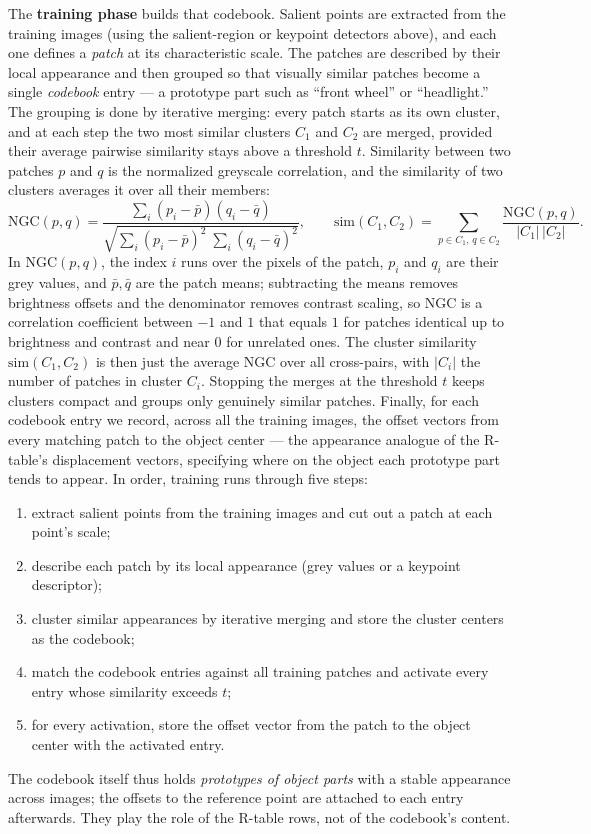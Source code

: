 The \textbf{training phase} builds that codebook. Salient points are extracted
from the training images (using the salient-region or keypoint detectors above),
and each one defines a \emph{patch} at its characteristic scale. The patches are
described by their local appearance and then grouped so that visually similar
patches become a single \emph{codebook} entry --- a prototype part such as ``front
wheel'' or ``headlight.'' The grouping is done by iterative merging: every patch
starts as its own cluster, and at each step the two most similar clusters $C_1$
and $C_2$ are merged, provided their average pairwise similarity stays above a
threshold $t$. Similarity between two patches $p$ and $q$ is the normalized
greyscale correlation, and the similarity of two clusters averages it over all
their members:
\begin{equation}
  \mathrm{NGC}(p,q) = \frac{\sum_i (p_i-\bar p)(q_i-\bar q)}
  {\sqrt{\sum_i (p_i-\bar p)^2 \;\sum_i (q_i-\bar q)^2}},
  \qquad
  \mathrm{sim}(C_1,C_2) = \!\!\sum_{p\in C_1,\,q\in C_2}\!\!
  \frac{\mathrm{NGC}(p,q)}{|C_1|\,|C_2|}.
  \label{eq:ngc}
\end{equation}
\noindent
In $\mathrm{NGC}(p,q)$, the index $i$ runs over the pixels of the patch, $p_i$ and
$q_i$ are their grey values, and $\bar p,\bar q$ are the patch means; subtracting
the means removes brightness offsets and the denominator removes contrast
scaling, so $\mathrm{NGC}$ is a correlation coefficient between $-1$ and $1$ that
equals $1$ for patches identical up to brightness and contrast and near $0$ for
unrelated ones. The cluster similarity $\mathrm{sim}(C_1,C_2)$ is then just the
average $\mathrm{NGC}$ over all cross-pairs, with $|C_i|$ the number of patches in
cluster $C_i$. Stopping the merges at the threshold $t$ keeps clusters compact and
groups only genuinely similar patches. Finally, for each codebook entry we record,
across all the training images, the offset vectors from every matching patch to
the object center --- the appearance analogue of the R-table's displacement
vectors, specifying where on the object each prototype part tends to appear.
In order, training runs through five steps:
\begin{enumerate}
  \item extract salient points from the training images and cut out a patch at
        each point's scale;
  \item describe each patch by its local appearance (grey values or a keypoint
        descriptor);
  \item cluster similar appearances by iterative merging and store the cluster
        centers as the codebook;
  \item match the codebook entries against all training patches and activate
        every entry whose similarity exceeds $t$;
  \item for every activation, store the offset vector from the patch to the
        object center with the activated entry.
\end{enumerate}
\noindent
The codebook itself thus holds \emph{prototypes of object parts} with a stable
appearance across images; the offsets to the reference point are attached to
each entry afterwards. They play the role of the R-table rows, not of the
codebook's content.

